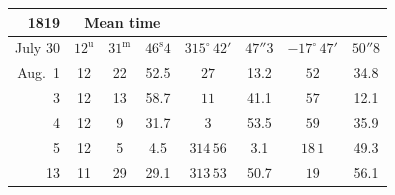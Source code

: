 \begin{center}
\begin{tabular}{r|ccc|cc|cc}
1819 & \multicolumn{3}{c|}{Mean time} & \multicolumn{2}{c|}{} & \multicolumn{2}{c}{} \\
\hline
July 30 & $12^{\mathrm{u}}$ & $31^{\mathrm{m}}$ & $46^{\mathrm{s}}4$ & $315^{\circ}\,42'$ & $47''3$ & $-17^{\circ}\,47'$ & $50''8$ \\
Aug.\ 1 & 12 & 22 & 52.5 & $27$ & 13.2 & $52$ & 34.8 \\
3 & 12 & 13 & 58.7 & $11$ & 41.1 & $57$ & 12.1 \\
4 & 12 & 9 & 31.7 & $3$ & 53.5 & $59$ & 35.9 \\
5 & 12 & 5 & 4.5 & $314\,56$ & 3.1 & $18\,1$ & 49.3 \\
13 & 11 & 29 & 29.1 & $313\,53$ & 50.7 & $19$ & 56.1 \\
\end{tabular}
\end{center}

